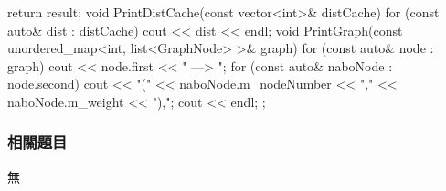 \begin{Code}
{{        return result;
    }
    void PrintDistCache(const vector<int>& distCache)
    {
        for (const auto& dist : distCache)
        {
            cout << dist << endl;
        }
    }
    void PrintGraph(const unordered_map<int, list<GraphNode> >& graph)
    {
        for (const auto& node : graph)
        {
            cout << node.first << " ---> ";
            for (const auto& naboNode : node.second)
            {
                cout << "(" << naboNode.m_nodeNumber << "," << naboNode.m_weight << "),";
            }
            cout << endl;
        }
    }
};
\end{Code}

\subsubsection{相關題目}
\begindot
\item 無
\myenddot
